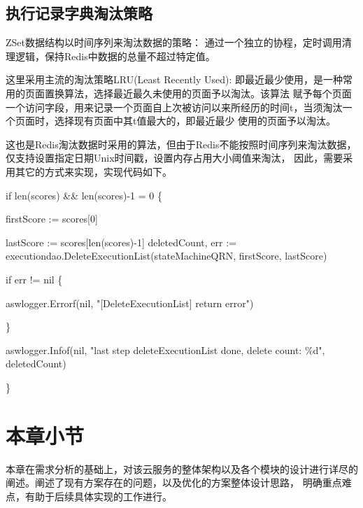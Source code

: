 \subsection{执行记录字典淘汰策略}
ZSet数据结构以时间序列来淘汰数据的策略： 通过一个独立的协程，定时调用清理逻辑，保持Redis中数据的总量不超过特定值。


这里采用主流的淘汰策略LRU(Least Recently Used): 即最近最少使用，是一种常用的页面置换算法，选择最近最久未使用的页面予以淘汰。该算法
赋予每个页面一个访问字段，用来记录一个页面自上次被访问以来所经历的时间t，当须淘汰一个页面时，选择现有页面中其t值最大的，即最近最少
使用的页面予以淘汰\cite{landman2021selfoptimizing}。

这也是Redis淘汰数据时采用的算法，但由于Redis不能按照时间序列来淘汰数据，仅支持设置指定日期Unix时间戳，设置内存占用大小阈值来淘汰，
因此，需要采用其它的方式来实现，实现代码如下。

\begin{algorithm}[H]
    \SetAlgoLined

    if len(scores)  \&\& len(scores)-1 \>= 0 \{

    firstScore := scores[0]

    lastScore := scores[len(scores)-1]
    deletedCount, err := executiondao.DeleteExecutionList(stateMachineQRN, firstScore, lastScore)

    if err != nil \{

    aswlogger.Errorf(nil, "[DeleteExecutionList] return error")

    \}

    aswlogger.Infof(nil, "last step deleteExecutionList done, delete count: \%d", deletedCount)

    \}
\end{algorithm}

\section{本章小节}
本章在需求分析的基础上，对该云服务的整体架构以及各个模块的设计进行详尽的阐述。阐述了现有方案存在的问题，以及优化的方案整体设计思路，
明确重点难点，有助于后续具体实现的工作进行。